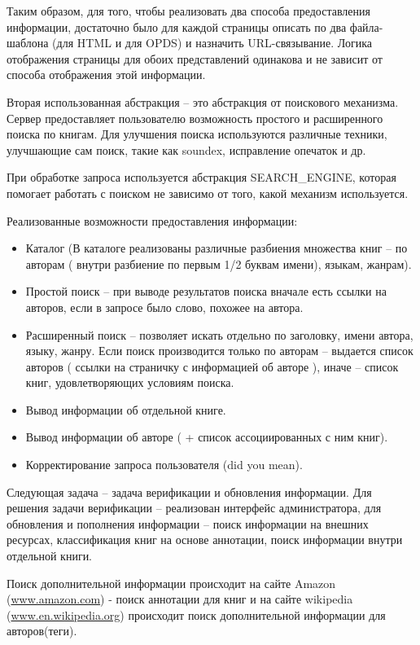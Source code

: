 \documentclass[a4paper]{report}
\begin{document}
Таким образом, для того, чтобы реализовать два способа предоставления информации, достаточно было для каждой страницы описать по два файла-шаблона (для HTML и для OPDS) и назначить URL-связывание. Логика отображения страницы для обоих представлений одинакова и не зависит от способа отображения этой информации. 

Вторая использованная абстракция -- это абстракция от поискового механизма. Сервер предоставляет пользователю возможность простого и расширенного поиска по книгам. Для улучшения поиска используются различные техники, улучшающие сам поиск, такие как soundex, исправление опечаток и др. %

При обработке запроса используется абстракция SEARCH\_ENGINE, которая помогает работать с поиском не зависимо от того, какой механизм используется.


Реализованные возможности предоставления информации:
\begin{itemize}
	\item Каталог (В каталоге реализованы различные разбиения множества книг -- по авторам ( внутри разбиение по первым 1/2 буквам имени), языкам, жанрам).
	\item Простой поиск -- при выводе результатов поиска вначале есть ссылки на авторов, если в запросе было слово, похожее на автора.
	\item Расширенный поиск -- позволяет искать отдельно по заголовку, имени автора, языку, жанру. Если поиск производится только по авторам -- выдается список авторов ( ссылки на страничку с информацией об авторе ), иначе -- список книг, удовлетворяющих условиям поиска.
\item Вывод информации об отдельной книге.
\item Вывод информации об авторе ( + список ассоциированных с ним книг).
\item Корректирование запроса пользователя (did you mean).
\end{itemize}



Следующая задача -- задача верификации и обновления информации. Для решения задачи верификации -- реализован интерфейс администратора, для обновления и пополнения информации -- поиск информации на внешних ресурсах, классификация книг на основе аннотации, поиск информации внутри отдельной книги.

Поиск дополнительной информации происходит на сайте Amazon (\url {www.amazon.com}) - поиск аннотации для книг и на сайте wikipedia (\url {www.en.wikipedia.org}) происходит поиск дополнительной информации для авторов(теги).
\end{document}
